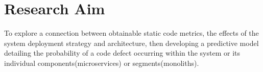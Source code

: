 \chapter{Research Aim}
To explore a connection between obtainable static code metrics, the effects of the system deployment strategy and architecture, then developing a predictive model detailing the probability of a code defect occurring within the system or its individual components(microservices) or segments(monoliths).